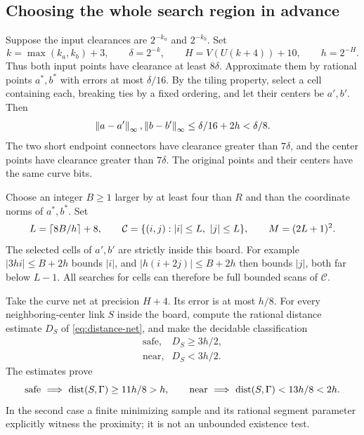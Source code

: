 \subsection{Choosing the whole search region in advance}

Suppose the input clearances are $2^{-k_a}$ and $2^{-k_b}$. Set
\begin{equation}
 k=\max(k_a,k_b)+3,\qquad \delta=2^{-k},
 \qquad H=V(U(k+4))+10,\qquad h=2^{-H}.
 \label{eq:route-scale}
\end{equation}
Thus both input points have clearance at least $8\delta$.
Approximate them by rational points $a^*,b^*$ with errors at most
$\delta/16$. By the tiling property, select a cell containing each,
breaking ties by a fixed ordering, and let their centers be $a',b'$.
Then
\[
 \left\lVert a-a'\right\rVert_\infty,\left\lVert b-b'\right\rVert_\infty\le\delta/16+2h<\delta/8.
\]
The two short endpoint connectors have clearance greater than
$7\delta$, and the center points have clearance greater than
$7\delta$. The original points and their centers have the same
curve bits.

Choose an integer $B\ge1$ larger by at least four than $R$ and than
the coordinate norms of $a^*,b^*$. Set
\begin{equation}
 L=\left\lceil 8B/h\right\rceil+8,\qquad
 \mathcal C=\{(i,j): |i|\le L,\ |j|\le L\},\qquad
 M=(2L+1)^2.
 \label{eq:board}
\end{equation}
The selected cells of $a',b'$ are strictly inside this board.
For example $|3hi|\le B+2h$ bounds $|i|$, and
$|h(i+2j)|\le B+2h$ then bounds $|j|$, both far below $L-1$.
All searches for cells can therefore be full bounded scans of
$\mathcal C$.

Take the curve net at precision $H+4$. Its error is at most
$h/8$. For every neighboring-center link $S$ inside the board,
compute the rational distance estimate $D_S$ of
\eqref{eq:distance-net}, and make the decidable classification
\begin{equation}
 \begin{array}{ll}
 \text{safe},&D_S\ge 3h/2,\\
 \text{near},&D_S<3h/2.
 \end{array}
 \label{eq:linkcolors}
\end{equation}
The estimates prove
\begin{equation}
 \text{safe}\ \Longrightarrow\ \dist(S,\Gamma)\ge11h/8>h,
 \qquad
 \text{near}\ \Longrightarrow\ \dist(S,\Gamma)<13h/8<2h.
 \label{eq:linkcert}
\end{equation}
In the second case a finite minimizing sample and its rational
segment parameter explicitly witness the proximity; it is not an
unbounded existence test.

